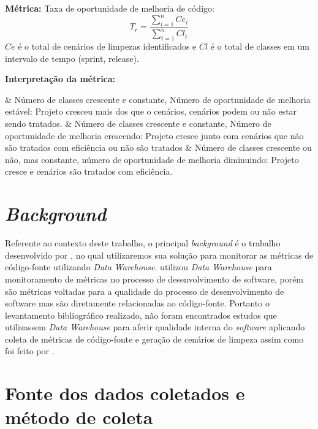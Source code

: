 \textbf{Métrica:} Taxa de oportunidade de melhoria de código: $$ T_r =   \frac{{\sum_{i=1}^{n}{Ce_i}}}{\sum_{i=1}^{n}{Cl_i}} $$ $ Ce $ é o total de cenários de limpezas identificados e $ Cl $  é o total de classes em um intervalo de tempo (sprint, release).

\textbf{Interpretação da métrica: } 

\begin{easylist}[itemize]	
	& Número de classes crescente e constante, Número de oportunidade de melhoria estável: Projeto cresceu mais dos 	que o cenários, cenários podem ou não estar sendo tratados.
	& Número de classes crescente e constante, Número de oportunidade de melhoria crescendo: Projeto cresce junto 		com cenários que não são tratados com eficiência ou não são tratados
	& Número de classes crescente ou não, mas constante, número de oportunidade de melhoria diminuindo: Projeto 		cresce e cenários são tratados com eficiência.	
	\end{easylist}	
	

\section{\textit{Background}}

Referente ao contexto deste trabalho, o principal \textit{background} é o trabalho desenvolvido por , no qual utilizaremos sua solução para monitorar as métricas de código-fonte utilizando \textit{Data Warehouse}.
 utilizou \textit{Data Warehouse} para monitoramento de métricas no processo de desenvolvimento de software, porém são métricas voltadas para a qualidade do processo de desenvolvimento de software mas são diretamente relacionadas ao código-fonte. Portanto o levantamento bibliográfico realizado, não foram encontrados estudos que utilizassem \textit{Data Warehouse} para aferir qualidade interna do \textit{software }aplicando coleta de métricas de código-fonte e geração de cenários de limpeza assim como foi feito por .



\section{Fonte dos dados coletados e método de coleta}

